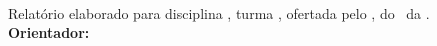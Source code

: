 \begin{center}
\autores
\vfill
{\bf\Large\titulo}\vspace{1cm}\\
{\raggedleft
\begin{minipage}[t]{0.6\textwidth}
Relatório elaborado para disciplina \disciplina, turma \turma, ofertada pelo \departamento, do \campus~da \universidade.
\vspace{12pt}\\
{\bf Orientador:} \prefixo~\orientador
\end{minipage}\\} 
\vfill
\local\\\ano
\end{center}